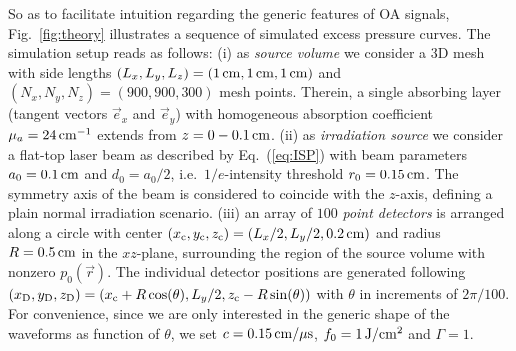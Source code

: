 \documentclass[12pt]{iopart}
\begin{document}
So as to facilitate intuition regarding the generic features of OA signals,
Fig.\ \ref{fig:theory} illustrates a sequence of simulated excess pressure
curves. The simulation setup reads as follows: 
(i) as \emph{source volume} we consider a $3$D mesh with side lengths
$(L_x,L_y,L_z)=(1\,{\rm cm},1\,{\rm cm},1\,{\rm cm})$ and
$(N_x,N_y,N_z)=(900,900,300)$ mesh points. Therein, a single absorbing layer
(tangent vectors $\vec{e}_x$ and $\vec{e}_y$) with homogeneous absorption
coefficient $\mu_a=24\,{\rm cm}^{-1}$ extends from $z=0 - 0.1\,{\rm cm}$.
(ii) as \emph{irradiation source} we consider a flat-top laser beam as
described by Eq.\ (\ref{eq:ISP}) with beam parameters $a_0=0.1\,{\rm cm}$ and
$d_0=a_0/2$, i.e.\ $1/e$-intensity threshold $r_0=0.15\,{\rm cm}$.  The
symmetry axis of the beam is considered to coincide with the $z$-axis, defining
a plain normal irradiation scenario.
(iii) an array of $100$ \emph{point detectors} is arranged along a circle with
center $(x_{\rm c},y_{\rm c},z_{\rm c})=(L_x/2,L_y/2,0.2\,{\rm cm})$ and
radius $R=0.5\,{\rm cm}$ in the $xz$-plane, surrounding the region of the
source volume with nonzero $p_0(\vec{r})$. The individual detector
positions are generated following $(x_{\rm D},y_{\rm D},z_{\rm D})=(x_{\rm c}+R
\cos(\theta),L_y/2,z_{\rm c}-R \sin(\theta))$ with $\theta$ in increments of 
$2\pi/100$.
For convenience, since we are only interested in the generic shape of the
waveforms as function of $\theta$, we set $c=0.15\,{\rm cm/\mu s}$,
$f_0=1\,{\rm J/cm^2}$ and $\Gamma=1$.
\end{document}
